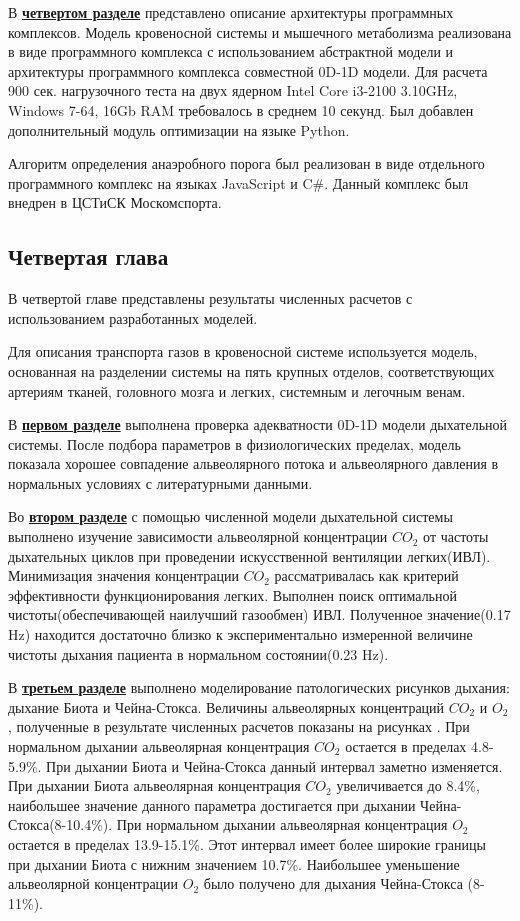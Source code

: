 В \underline{\textbf{четвертом разделе}} представлено описание архитектуры программных комплексов. Модель кровеносной системы и мышечного метаболизма реализована в виде программного комплекса с использованием абстрактной модели и архитектуры программного комплекса совместной 0D-1D модели. Для расчета 900 сек. нагрузочного теста на двух ядерном Intel Core i3-2100 3.10GHz, Windows 7-64, 16Gb RAM требовалось в среднем 10 секунд. Был добавлен дополнительный модуль оптимизации на языке Python.

Алгоритм определения анаэробного порога был реализован в виде отдельного программного комплекс на языках JavaScript и C\#. Данный комплекс был внедрен в ЦСТиСК Москомспорта. 

\subsection*{Четвертая глава}

В четвертой главе представлены результаты численных расчетов с использованием разработанных моделей.

Для описания транспорта газов в кровеносной системе используется модель, основанная на разделении системы на пять крупных отделов, соответствующих артериям тканей, головного мозга и легких, системным и легочным венам.


В \underline{\textbf{первом разделе}} выполнена проверка адекватности 0D-1D модели дыхательной системы. После подбора параметров в физиологических пределах, модель показала хорошее совпадение альвеолярного потока и альвеолярного давления в нормальных условиях с литературными данными.

Во \underline{\textbf{втором разделе}} с помощью численной модели дыхательной системы выполнено изучение зависимости альвеолярной концентрации $CO_{2} $ от частоты дыхательных циклов при проведении искусственной вентиляции легких(ИВЛ). Минимизация значения концентрации $CO_{2} $ рассматривалась как критерий эффективности функционирования легких. Выполнен поиск оптимальной чистоты(обеспечивающей наилучший газообмен) ИВЛ. Полученное значение(0.17 Hz) находится достаточно близко к экспериментально измеренной величине чистоты дыхания пациента в нормальном состоянии(0.23 Hz).

В \underline{\textbf{третьем разделе}} выполнено моделирование патологических рисунков дыхания: дыхание Биота и Чейна-Стокса. Величины альвеолярных концентраций $CO_{2} $ и $O_{2} $, полученные в результате численных расчетов показаны на рисунках . При нормальном дыхании альвеолярная концентрация $CO_{2} $ остается в пределах 4.8-5.9\%. При дыхании Биота и Чейна-Стокса данный интервал заметно изменяется.  При дыхании Биота альвеолярная концентрация $CO_{2} $ увеличивается до 8.4\%, наибольшее значение данного параметра достигается при дыхании Чейна-Стокса(8-10.4\%). При нормальном дыхании альвеолярная концентрация $O_{2} $ остается в пределах 13.9-15.1\%. Этот интервал имеет более широкие границы при дыхании Биота с нижним значением 10.7\%. Наибольшее уменьшение альвеолярной концентрации $O_{2} $ было получено для дыхания Чейна-Стокса (8-11\%).

